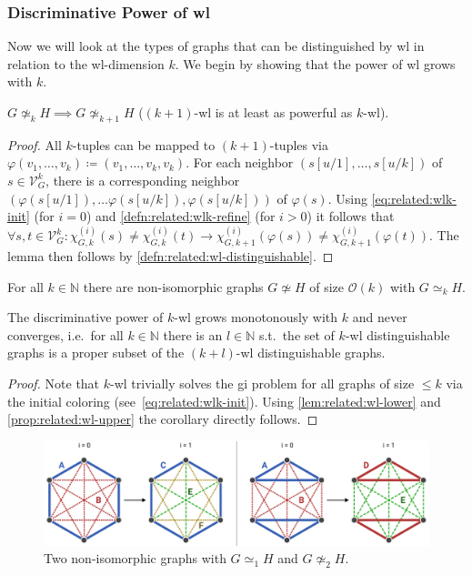 \subsubsection{Discriminative Power of \acs{wl}}
Now we will look at the types of graphs that can be distinguished by \ac{wl} in relation to the \acs{wl}-dimension $k$.
We begin by showing that the power of \ac{wl} grows with $k$.
\begin{lem}\label{lem:related:wl-lower}
	$G \mathrel{\not\simeq_k} H \implies G \mathrel{\not\simeq_{k+1}} H$ ($(k+1)$-\acs{wl} is at least as powerful as $k$-\acs{wl}).
\end{lem}
\begin{proof}
	All $k$-tuples can be mapped to $(k+1)$-tuples via $\varphi(v_1, \dots, v_k) \coloneqq (v_1, \dots,\allowbreak v_k, v_k)$.
	For each neighbor $(s[u/1], \dots,\allowbreak s[u/k])$ of $s \in \mathcal{V}_G^k$, there is a corresponding neighbor $(\varphi(s[u/1]), \dots \varphi(s[u/k]), \varphi(s[u/k]))$ of $\varphi(s)$.
	Using \cref{eq:related:wlk-init} (for $i = 0$) and \cref{defn:related:wlk-refine} (for $i > 0$) it follows that $\forall s, t \in \mathcal{V}_G^k: \chi_{G, k}^{(i)}(s) \neq \chi_{G, k}^{(i)}(t) \rightarrow \chi_{G, k+1}^{(i)}(\varphi(s)) \neq \chi_{G, k+1}^{(i)}(\varphi(t))$.
	The lemma then follows by \cref{defn:related:wl-distinguishable}.
\end{proof}
\begin{prop}\label{prop:related:wl-upper}
	For all $k \in \mathbb{N}$ there are non-isomorphic graphs $G \not\simeq H$ of size $\mathcal{O}(k)$ with $G \mathrel{\simeq_k} H$.
\end{prop}
\begin{cor}\label{cor:related:wl-monotonous}
	The discriminative power of $k$-\acs{wl} grows monotonously with $k$ and never converges, i.e.\ for all $k \in \mathbb{N}$ there is an $l \in \mathbb{N}$ s.t.\ the set of $k$-\ac{wl} distinguishable graphs is a proper subset of the $(k+l)$-\ac{wl} distinguishable graphs.
\end{cor}
\begin{proof}
	Note that $k$-\acs{wl} trivially solves the \ac{gi} problem for all graphs of size $\leq k$ via the initial coloring (see~\cref{eq:related:wlk-init}).
	Using \cref{lem:related:wl-lower} and \cref{prop:related:wl-upper} the corollary directly follows.
\end{proof}
\begin{figure}[ht]
	\centering
	\includegraphics[width=\linewidth]{gfx/related-work/wl2-problem-solution.pdf}
	\caption{
		Two non-isomorphic graphs with $G \mathrel{\simeq_1} H$ and $G \mathrel{\not\simeq_2} H$.
	}\label{fig:related:wl2-problem-solution}
\end{figure}
